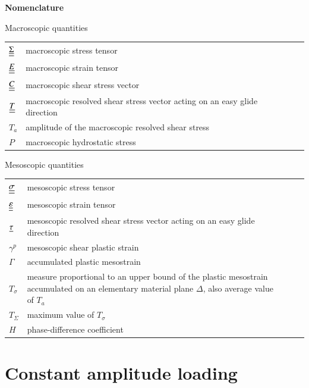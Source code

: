 \documentclass[3p,times,procedia,number]{elsarticle}
\begin{document}
\clearpage
\begin{flushleft}
	\textbf{Nomenclature}
	
	\vspace{6pt}
Macroscopic quantities

	\begin{table}[h]
		\begin{tabular}{lllll}
			$\uline{\uline{\Sigma}}$ & macroscopic stress tensor &  &  &  \\
			$\uline{\uline{E}}$ & macroscopic strain tensor &  &  &  \\
			$\uline{\uline{C}}$ & macroscopic shear stress vector  &  &  &  \\
			$\uline{\uline{T}}$ & macroscopic resolved shear stress vector acting on an easy glide direction&  &  &  \\
			$T_a$ & amplitude of the macroscopic resolved shear stress  &  &  &  \\	
			$P$ & macroscopic hydrostatic stress &  &  &  \\	
\end{tabular}
\end{table}

Mesoscopic quantities

					\begin{table}[h]
						\begin{tabular}{lllll}
			$\uline{\uline{\sigma}}$& mesoscopic stress tensor &  &  &  \\
			$\uline{\uline{\varepsilon}}$ & mesoscopic strain tensor &  &  &  \\
			$\uline{\tau}$& mesoscopic resolved shear stress vector acting on an easy glide direction &  &  &  \\
			$\gamma^p$& mesoscopic shear plastic strain &  &  &  \\
			$\Gamma$ & accumulated plastic mesostrain &  &  &  \\
			$T_\sigma$ & measure proportional to an upper bound of the plastic mesostrain accumulated on an elementary
			material plane $\Delta$, also average value of $T_a$ &  &  &  \\
			$T_\Sigma$ & maximum value of  $T_\sigma$&  &  &  \\
			$H$ & phase-difference coefficient&  &  &  \\
		\end{tabular}
	\end{table}
\end{flushleft}

\clearpage
\section{Constant amplitude loading}
\end{document}
